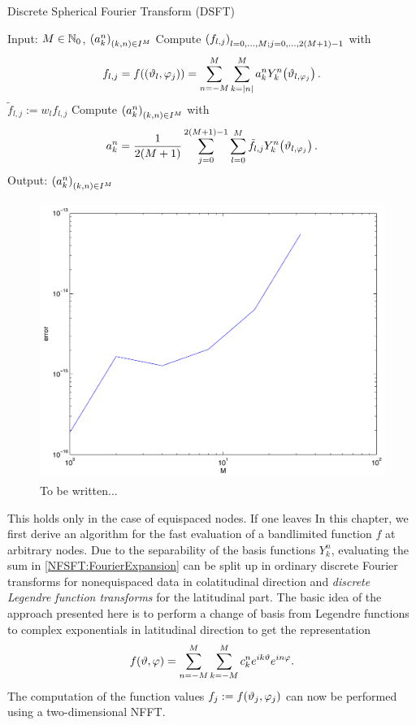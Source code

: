 \begin{algorithm}[ht]
  \caption{Discrete Spherical Fourier Transform (DSFT)}
  \label{NFSFT:DSFT}    
  \begin{algorithmic}
    \STATE  Input: $M \in \mathbb{N}_{0}$, $\left(a_{k}^n\right)_{\left(k,n\right) \in I^M}$
    \STATE
    \STATE Compute $\left(f_{l,j}\right)_{l=0,\ldots,M;j=0,\ldots,2(M+1)-1}$ with 
      $$f_{l,j} = f{\hspace{-0.4ex}}\left(\left(\vartheta_{l},\varphi_{j}\right)\right) = \sum_{n=-M}^{M} \sum_{k=\left\vert n\right\vert}^M a_{k}^n Y_{k}^n{\hspace{-0.4ex}}\left(\vartheta_{l,\varphi_{j}}\right).$$
    \STATE 
        \STATE $\tilde{f}_{l,j} := w_{l} f_{l,j}$
      \ENDFOR
    \ENDFOR
    \STATE
    \STATE Compute $\left(a_{k}^n\right)_{\left(k,n\right) \in I^M}$ with 
      $$a_{k}^n = \frac{1}{2(M+1)} \sum_{j=0}^{2(M+1)-1} \sum_{l=0}^{M} \tilde{f}_{l,j} Y_{k}^n{\hspace{-0.4ex}}\left(\vartheta_{l,\varphi_{j}}\right).$$
    \STATE
    \STATE Output: $\left(a_{k}^n\right)_{\left(k,n\right) \in I^M}$
\end{algorithmic}
\end{algorithm}

\begin{figure}[tb]
  \centering
  \includegraphics[height=9cm,width=12cm]{images/accuracy}
  \caption{To be written...}
  \label{NFSFT:Figure:Accuracy}
\end{figure}

This holds only in the case of equispaced nodes. If one leaves 
In this chapter, we first derive an algorithm for the fast evaluation of a bandlimited function $f$ at arbitrary nodes. Due to the separability 
of the basis functions $Y_k^n$, evaluating the sum in \eqref{NFSFT:FourierExpansion} can be split up in ordinary discrete Fourier transforms for nonequispaced 
data in colatitudinal direction and \emph{discrete Legendre function transforms} for the latitudinal part. The basic idea of the approach 
presented here is to perform a change of basis from Legendre functions to complex exponentials in latitudinal direction to get the 
representation
$$ f{\hspace{-0.4ex}}\left(\vartheta,\varphi\right) = \sum_{n=-M}^{M} \sum_{k=-M}^M c_k^n e^{ik\vartheta} e^{in\varphi}.$$
The computation of the function values $f_j := f{\hspace{-0.4ex}}\left(\vartheta_j,\varphi_j\right)$ can now be performed 
using a two-dimensional NFFT. 

